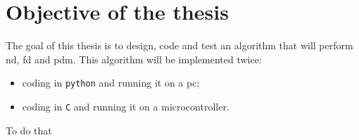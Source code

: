 \section{Objective of the thesis}
\label{sec:objectives}

The goal of this thesis is to design, code and test an algorithm that will perform \gls{nd}, \gls{fd} and \gls{pdm}. This algorithm will be implemented twice:
\begin{itemize}
    \item  coding in \texttt{python} and running it on a \gls{pc};
    \item   coding in \texttt{C} and running it on a microcontroller.
\end{itemize}

To do that 